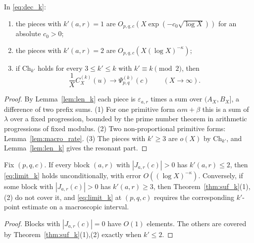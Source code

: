 \begin{theorem}[Sufficiency]
\label{thm:suf_k}
In \eqref{eq:dec_k}:
\begin{enumerate}
\item the pieces with $k'(a,r)=1$ are $O_{p,q,c}(X\exp(-c_0\sqrt{\log X}))$ for an absolute $c_0>0$;
\item the pieces with $k'(a,r)=2$ are $O_{p,q,c}(X(\log X)^{-\kappa})$;
\item if $\mathrm{Ch}_{k'}$ holds for every $3\le k'\le k$ with $k'\equiv k\pmod2$, then
\begin{equation}
\frac1XC^{(k)}_X(u)\longrightarrow\Psi^{(k)}_{p,q}(c)\qquad(X\to\infty).
\label{eq:limit_k}
\end{equation}
\end{enumerate}
\end{theorem}

\begin{proof}
By Lemma~\ref{lem:len_k} each piece is $\varepsilon_{a,r}$ times a sum over $(A_X,B_X]$, a difference of two prefix sums. (1) For one primitive form $\alpha m+\beta$ this is a sum of $\lambda$ over a fixed progression, bounded by the prime number theorem in arithmetic progressions of fixed modulus. (2) Two non-proportional primitive forms: Lemma~\ref{lem:macro_rate}. (3) The pieces with $k'\ge3$ are $o(X)$ by $\mathrm{Ch}_{k'}$, and Lemma~\ref{lem:len_k} gives the resonant part.
\end{proof}

\begin{proposition}
\label{prop:criterion}
Fix $(p,q,c)$. If every block $(a,r)$ with $|J_{a,r}(c)|>0$ has $k'(a,r)\le2$, then \eqref{eq:limit_k} holds unconditionally, with error $O((\log X)^{-\kappa})$. Conversely, if some block with $|J_{a,r}(c)|>0$ has $k'(a,r)\ge3$, then Theorem~\ref{thm:suf_k}(1),(2) do not cover it, and \eqref{eq:limit_k} at $(p,q,c)$ requires the corresponding $k'$-point estimate on a macroscopic interval.
\end{proposition}

\begin{proof}
Blocks with $|J_{a,r}(c)|=0$ have $O(1)$ elements. The others are covered by Theorem~\ref{thm:suf_k}(1),(2) exactly when $k'\le2$.
\end{proof}

